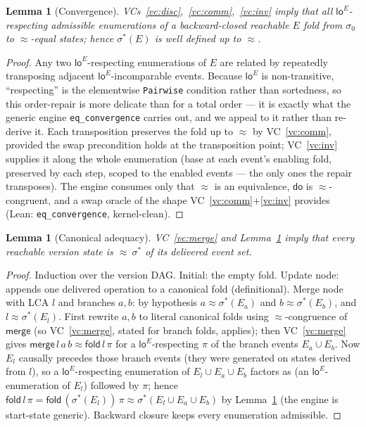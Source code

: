 \documentclass[11pt]{article}
\newtheorem{lemma}[theorem]{Lemma}
\newcommand{\loE}[1]{\mathsf{lo}^{#1}}
\newcommand{\lean}[1]{\texttt{#1}}
\newcommand{\st}{\sigma}
\newcommand{\ini}{\st_0}
\newcommand{\dodo}{\mathsf{do}}
\newcommand{\merge}{\mathsf{merge}}
\newcommand{\eqobs}{\approx}
\newcommand{\fold}{\mathsf{fold}}
\newcommand{\sigmacan}{\st^{\ast}}
\begin{document}
\begin{lemma}[Convergence]\label{lem:conv}
VCs~\ref{vc:disc},~\ref{vc:comm},~\ref{vc:inv} imply that all $\loE{E}$-respecting admissible
enumerations of a backward-closed reachable $E$ fold from $\ini$ to $\eqobs$-equal states;
hence $\sigmacan(E)$ is well defined up to $\eqobs$.
\end{lemma}
\begin{proof}
Any two $\loE{E}$-respecting enumerations of $E$ are related by repeatedly transposing adjacent
$\loE{E}$-incomparable events. Because $\loE{E}$ is non-transitive, ``respecting'' is the elementwise
\lean{Pairwise} condition rather than sortedness, so this order-repair is more delicate than
for a total order --- it is exactly what the generic engine \lean{eq\_convergence} carries out,
and we appeal to it rather than re-derive it. Each transposition preserves the fold up to
$\eqobs$ by VC~\ref{vc:comm}, provided the swap precondition holds at the transposition point;
VC~\ref{vc:inv} supplies it along the whole enumeration (base at each event's enabling fold,
preserved by each step, scoped to the enabled events --- the only ones the repair transposes).
The engine consumes only that $\eqobs$ is an equivalence, $\dodo$ is $\eqobs$-congruent, and a
swap oracle of the shape VC~\ref{vc:comm}$+$\ref{vc:inv} provides (Lean: \lean{eq\_convergence},
kernel-clean).
\end{proof}

\begin{lemma}[Canonical adequacy]\label{lem:adeq}
VC~\ref{vc:merge} and Lemma~\ref{lem:conv} imply that every reachable version state is
$\eqobs\ \sigmacan$ of its delivered event set.
\end{lemma}
\begin{proof}
Induction over the version DAG. Initial: the empty fold. Update node: appends one delivered
operation to a canonical fold (definitional). Merge node with LCA $l$ and branches $a,b$: by
hypothesis $a \eqobs \sigmacan(E_a)$ and $b \eqobs \sigmacan(E_b)$, and $l \eqobs
\sigmacan(E_l)$. First rewrite $a,b$ to literal canonical folds using $\eqobs$-congruence of
$\merge$ (so VC~\ref{vc:merge}, stated for branch folds, applies); then VC~\ref{vc:merge}
gives $\merge\,l\,a\,b \eqobs \fold\,l\,\pi$ for a $\loE{E}$-respecting $\pi$ of the branch
events $E_a \cup E_b$. Now $E_l$ causally precedes those branch events (they were generated on
states derived from $l$), so a $\loE{E}$-respecting enumeration of $E_l \cup E_a \cup E_b$
factors as (an $\loE{E}$-enumeration of $E_l$) followed by $\pi$; hence
$\fold\,l\,\pi = \fold\,(\sigmacan(E_l))\,\pi \eqobs \sigmacan(E_l \cup E_a \cup E_b)$ by
Lemma~\ref{lem:conv} (the engine is start-state generic). Backward closure keeps every
enumeration admissible.
\end{proof}
\end{document}
